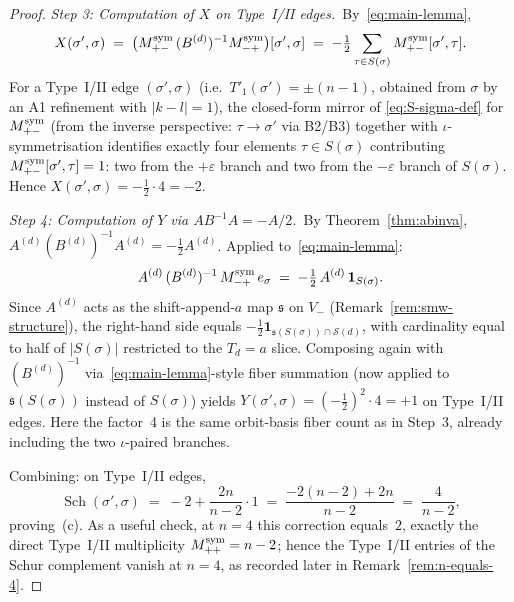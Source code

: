 \documentclass{amsart}
\theoremstyle{definition}
\theoremstyle{remark}
\begin{document}
\begin{proof}
\medskip
\textit{Step 3: Computation of $X$ on Type~I/II edges.}\
By~\eqref{eq:main-lemma},
\[
  X(\sigma', \sigma)
  \;=\; \bigl(M_{+-}^{\rm sym}\,
        (B^{(d)})^{-1} M_{-+}^{\rm sym}\bigr)[\sigma', \sigma]
  \;=\; -\tfrac12
        \sum_{\tau \in S(\sigma)}
        M_{+-}^{\rm sym}[\sigma', \tau].
\]
For a Type~I/II edge $(\sigma', \sigma)$ (i.e.\
$T'_1(\sigma') = \pm(n-1)$, obtained from $\sigma$ by an A1
refinement with $|k - l| = 1$), the closed-form mirror of
\eqref{eq:S-sigma-def} for $M_{+-}^{\rm sym}$
\textup{(}from the inverse perspective: $\tau \to \sigma'$
via B2/B3\textup{)} together with $\iota$-symmetrisation
identifies exactly four elements $\tau \in S(\sigma)$
contributing $M_{+-}^{\rm sym}[\sigma', \tau] = 1$: two from
the $+\varepsilon$ branch and two from the $-\varepsilon$
branch of $S(\sigma)$.  Hence
$X(\sigma', \sigma) = -\tfrac12 \cdot 4 = -2$.

\medskip
\textit{Step 4: Computation of $Y$ via $A B^{-1} A = -A/2$.}\
By Theorem~\ref{thm:abinva}, $A^{(d)} (B^{(d)})^{-1} A^{(d)} =
-\tfrac12 A^{(d)}$.  Applied to~\eqref{eq:main-lemma}:
\[
  A^{(d)}\, (B^{(d)})^{-1}\, M_{-+}^{\rm sym}\, e_\sigma
  \;=\; -\tfrac12\, A^{(d)}\, \mathbf{1}_{S(\sigma)}.
\]
Since $A^{(d)}$ acts as the shift-append-$a$ map $\mathfrak{s}$
on $V_-$ (Remark~\ref{rem:smw-structure}), the right-hand side
equals $-\tfrac12 \mathbf{1}_{\mathfrak{s}(S(\sigma)) \cap
\mathcal{S}(d)}$, with cardinality equal to half of $|S(\sigma)|$
restricted to the $T_d = a$ slice.  Composing again with
$(B^{(d)})^{-1}$ via~\eqref{eq:main-lemma}-style fiber
summation (now applied to $\mathfrak{s}(S(\sigma))$ instead of
$S(\sigma)$) yields $Y(\sigma', \sigma) = (-\tfrac12)^2 \cdot 4
= +1$ on Type~I/II edges.  Here the factor~4 is the same
orbit-basis fiber count as in Step~3, already including the two
$\iota$-paired branches.

\medskip
Combining: on Type~I/II edges,
\[
  \operatorname{Sch}(\sigma', \sigma)
  \;=\; -2 + \frac{2 n}{n - 2}\cdot 1
  \;=\; \frac{-2(n-2) + 2 n}{n - 2}
  \;=\; \frac{4}{n - 2},
\]
proving~\textup{(c)}.
As a useful check, at $n=4$ this correction equals~$2$, exactly
the direct Type~I/II multiplicity $M_{++}^{\rm sym}=n-2$; hence
the Type~I/II entries of the Schur complement vanish at $n=4$,
as recorded later in Remark~\ref{rem:n-equals-4}.
\end{proof}
\end{document}

